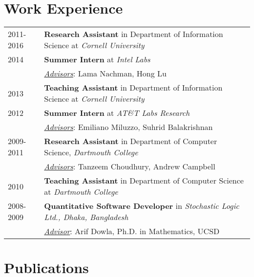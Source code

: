 \documentclass[10pt,fullpage]{article}
\begin{document}
\section*{\textbf{Work Experience}}
\vspace{-1em}
\begin{longtable}{p{0.7in}|p{5.5in}}
	2011-2016 & {\bf Research Assistant} in Department of Information Science at {\it Cornell University} \vspace{0.15cm}\\
	2014 & {\bf Summer Intern} at {\it Intel Labs} \\
		& \underline{{\it Advisors}}: Lama Nachman, Hong Lu \vspace{0.15cm}\\	
	2013 & {\bf Teaching Assistant} in Department of Information Science at {\it Cornell University} \vspace{0.15cm}\\
	2012 & {\bf Summer Intern} at {\it AT\&T Labs Research} \\
		& \underline{{\it Advisors}}: Emiliano Miluzzo, Suhrid Balakrishnan \vspace{0.15cm}\\	
	2009-2011 & {\bf Research Assistant} in Department of Computer Science, {\it Dartmouth College} \\
			& \underline{{\it Advisors}}: Tanzeem Choudhury, Andrew Campbell \vspace{0.15cm}\\
	2010 & {\bf Teaching Assistant} in Department of Computer Science at {\it Dartmouth College} \vspace{0.15cm}\\
	2008-2009 & {\bf Quantitative Software Developer} in {\it Stochastic Logic Ltd., Dhaka, Bangladesh}\\
			&  \underline{{\it Advisor}}: Arif Dowla, Ph.D. in Mathematics, UCSD\\	
\end{longtable}
\vspace{0.5em}


\section*{\textbf{Publications}}
\setlength{\extrarowheight}{10pt}
\begin{comment}
\subsection*{\textbf{Under review}}
\vspace{-1.5em}
\begin{longtable}{p{0.7in}|p{5.5in}}
  2015 & \bibentry{mash2015ubicomp} \\
  	  & \bibentry{mash2015wh} \\ 
	  &\\
\end{longtable}
\end{comment}
\end{document}
